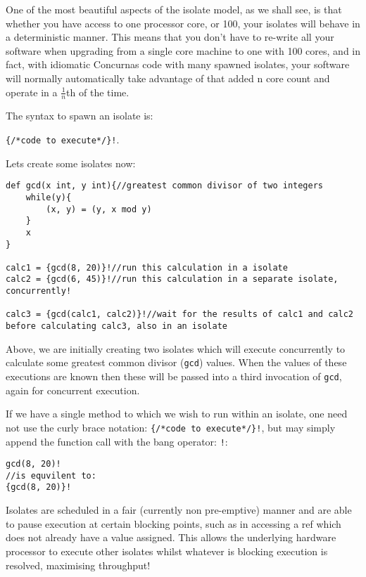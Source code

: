 \documentclass[conc-doc]{subfiles}
\begin{document}
One of the most beautiful aspects of the isolate model, as we shall see, is that whether you have access to one processor core, or 100, your isolates will behave in a deterministic manner. This means that you don't have to re-write all your software when upgrading from a single core machine to one with 100 cores, and in fact, with idiomatic Concurnas code with many spawned isolates, your software will normally automatically take advantage of that added n core count and operate in a $\frac{1}{n}$th of the time.

The syntax to spawn an isolate is: 
\begin{center}
	\lstinline!{/*code to execute*/}!\lstinline{!}. 
\end{center}

Lets create some isolates now:
\begin{lstlisting}
def gcd(x int, y int){//greatest common divisor of two integers
	while(y){
		(x, y) = (y, x mod y)
	}
	x
}

calc1 = {gcd(8, 20)}!//run this calculation in a isolate
calc2 = {gcd(6, 45)}!//run this calculation in a separate isolate, concurrently!

calc3 = {gcd(calc1, calc2)}!//wait for the results of calc1 and calc2 before calculating calc3, also in an isolate
\end{lstlisting}

Above, we are initially creating two isolates which will execute concurrently to calculate some greatest common divisor (\lstinline{gcd}) values. When the values of these executions are known then these will be passed into a third invocation of \lstinline{gcd}, again for concurrent execution.

If we have a single method to which we wish to run within an isolate, one need not use the curly brace notation: \lstinline!{/*code to execute*/}!\lstinline{!}, but may simply append the function call with the bang operator: \lstinline{!}:

\begin{lstlisting}
gcd(8, 20)!
//is equvilent to:
{gcd(8, 20)}!
\end{lstlisting}

Isolates are scheduled in a fair (currently non pre-emptive) manner and are able to pause execution at certain blocking points, such as in accessing a ref which does not already have a value assigned. This allows the underlying hardware processor to execute other isolates whilst whatever is blocking execution is resolved, maximising throughput!
\end{document}
